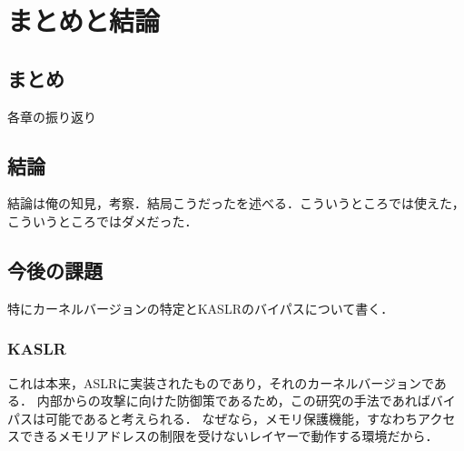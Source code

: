 \chapter{まとめと結論}
\label{chap:conclusion}

\section{まとめ}

各章の振り返り

\section{結論}

結論は俺の知見，考察．結局こうだったを述べる．こういうところでは使えた，こういうところではダメだった．

\section{今後の課題}

特にカーネルバージョンの特定とKASLRのバイパスについて書く．

\subsection{KASLR}

これは本来，ASLRに実装されたものであり，それのカーネルバージョンである．
内部からの攻撃に向けた防御策であるため，この研究の手法であればバイパスは可能であると考えられる．
なぜなら，メモリ保護機能，すなわちアクセスできるメモリアドレスの制限を受けないレイヤーで動作する環境だから．
